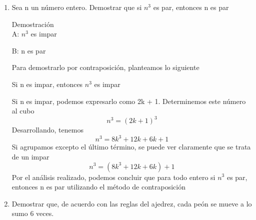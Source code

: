 \documentclass{article}
\begin{document}
\begin {enumerate}
$$ \sqrt{xy} \leq \frac{x + y}{2}$$
Demostración
\\

Si observamos lo que debemos demostrar, 

$$ \sqrt{xy} \leq \frac{x + y}{2}$$

Elevando al cuadrado a dos números positivos, la desigualdad se mantiene, asi
\begin {equation}
\label {pregunta 24 ec 3}
xy \leq \frac{(x + y)^2}{4}
\end{equation}
De donde, se llega a obtener que
\begin {equation}
\label {pregunta 24 ec 4}
4xy \leq x^2 + 2xy + y^2
\end {equation}
Simplificando términos semejantes, se tiene
\begin {equation}
\label {pregunta 24 ec 5}
0 \leq x^2 - 2xy + y^2
\end {equation}
que es equivalente a
\begin {equation}
\label {pregunta 24 ec 6}
(x - y)^2 \geq 0
\end {equation}
Si observamos la desigualdad (\ref {pregunta 24 ec 6}), podemos decir que cumple para todo x, y $\in \mathbb{R}$, ya que todo número elevado a potencia par es mayor o igual cero.  Al desarrollar llegamos a (\ref {pregunta 24 ec 5}), que sumando a ambos lados el término 4xy se obtiene la inecuación (\ref {pregunta 24 ec 4}), que es equivalente a (\ref {pregunta 24 ec 3}); resulta entonces que si x e y son números reales positivos, entonces
$$ \sqrt{xy} \leq \frac{x + y}{2}$$
\item
Sea n un número entero.  Demostrar que si $n^3$ es par, entonces n es par

Demostración
\\ 

A: $n^3$ es impar

B: n es par

Para demostrarlo por contraposición, planteamos lo siguiente

Si n es impar, entonces $n^3$ es impar

Si n es impar, podemos expresarlo como 2k + 1.  Determinemos este número al cubo
$$n^3 =(2k + 1)^3 $$
Desarrollando, tenemos
$$n^3 =8k^3 + 12k + 6k + 1$$
Si agrupamos excepto el último término, se puede ver claramente que se trata de un impar
$$n^3 =(8k^3 + 12k + 6k ) + 1$$
Por el análisis realizado, podemos concluir que para todo entero si $n^3$ es par, entonces n es par utilizando el método de contraposición
\item
Demostrar que, de acuerdo con las reglas del ajedrez, cada peón se mueve a lo sumo 6 veces.
\\ 


\end{enumerate}
\end{document}
